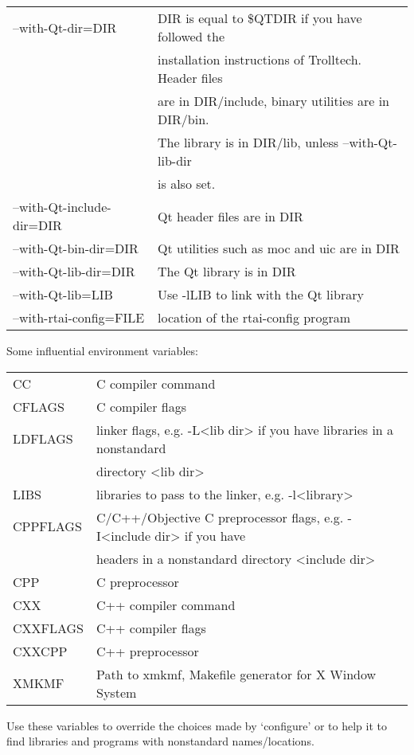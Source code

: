 \begin{maxipage}
\begin{example}
\begin{tabular}{ll}

--with-Qt-dir=DIR      &   DIR is equal to \$QTDIR if you have followed the \\
& installation instructions of Trolltech. Header files \\
& are in DIR/include, binary utilities are in DIR/bin. \\
& The library is in DIR/lib, unless --with-Qt-lib-dir \\
& is also set.\\
--with-Qt-include-dir=DIR  & Qt header files are in DIR\\
--with-Qt-bin-dir=DIR  &   Qt utilities such as moc and uic are in DIR\\
--with-Qt-lib-dir=DIR   &  The Qt library is in DIR\\
--with-Qt-lib=LIB      &   Use -lLIB to link with the Qt library\\
--with-rtai-config=FILE  & location of the rtai-config program
\end{tabular}

Some influential environment variables:\\ \vspace{.4cm}
\begin{tabular}{ll}
CC      &      C compiler command\\
CFLAGS    &    C compiler flags\\
LDFLAGS   &    linker flags, e.g. -L<lib dir> if you have libraries in a nonstandard\\
&  directory <lib dir>\\
LIBS   &       libraries to pass to the linker, e.g. -l<library>\\
CPPFLAGS  &    C/C++/Objective C preprocessor flags, e.g. -I<include dir> if you have\\
& headers in a nonstandard directory <include dir>\\
CPP       &    C preprocessor\\
CXX       &    C++ compiler command\\
CXXFLAGS   &   C++ compiler flags\\
CXXCPP    &    C++ preprocessor\\
XMKMF     &    Path to xmkmf, Makefile generator for X Window System
\end{tabular}

Use these variables to override the choices made by `configure' or to help it to find libraries and programs with nonstandard names/locations.

\end{example}
\end{maxipage}